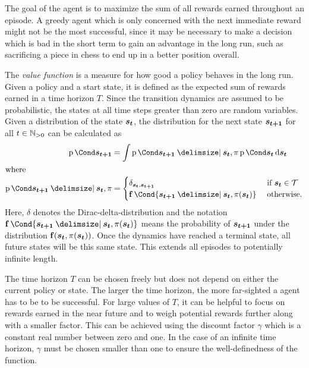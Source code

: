 The goal of the agent is to maximize the sum of all rewards earned throughout an episode.
A greedy agent which is only concerned with the next immediate reward might not be the most successful, since it may be necessary to make a decision which is bad in the short term to gain an advantage in the long run, such as sacrificing a piece in chess to end up in a better position overall.

The \emph{value function} is a measure for how good a policy behaves in the long run.
Given a policy and a start state, it is defined as the expected sum of rewards earned in a time horizon $T$.
Since the transition dynamics are assumed to be probabilistic, the states at all time steps greater than zero are random variables.
Given a distribution of the state $\bm{s_t}$, the distribution for the next state $\bm{s_{t+1}}$ for all $t \in \mathbb{N}_{>0}$ can be calculated as
\begin{align}
    \Prob{\rv{s_{t+1}}} &= \int \Prob{\rv{s_{t+1}} \given \rv{s_t}, \pi}\Prob{\rv{s_t}} \diff \rv{s_t} \\
    \intertext{where}
    \label{eq:rl_successive_state}
    \Prob{\rv{s_{t+1}} \given \rv{s_t}, \pi} &= \begin{cases}
        \delta_{\rv{s_t}, \rv{s_{t+1}}} & \text{ if $\rv{s_t} \in \Tee$} \\
        \Dyn\Cond{\rv{s_{t+1}} \given \rv{s_t}, \pi(\rv{s_t})} & \text{ otherwise.}
    \end{cases}
\end{align}
Here, $\delta$ denotes the Dirac-delta-distribution and the notation $\Dyn\Cond{\rv{s_{t+1}} \given \rv{s_t}, \pi(\rv{s_t})}$ means the probability of $\bm{s_{t+1}}$ under the distribution $\Dyn(\rv{s_t}, \pi(\rv{s_t}))$.
Once the dynamics have reached a terminal state, all future states will be this same state.
This extends all episodes to potentially infinite length.

The time horizon $T$ can be chosen freely but does not depend on either the current policy or state.
The larger the time horizon, the more far-sighted a agent has to be to be successful.
For large values of $T$, it can be helpful to focus on rewards earned in the near future and to weigh potential rewards further along with a smaller factor.
This can be achieved using the discount factor $\gamma$ which is a constant real number between zero and one.
In the case of an infinite time horizon, $\gamma$ must be chosen smaller than one to ensure the well-definedness of the function.

